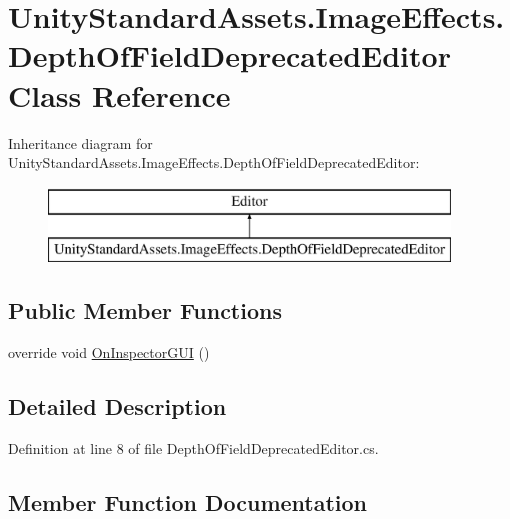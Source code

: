 \hypertarget{class_unity_standard_assets_1_1_image_effects_1_1_depth_of_field_deprecated_editor}{}\section{Unity\+Standard\+Assets.\+Image\+Effects.\+Depth\+Of\+Field\+Deprecated\+Editor Class Reference}
\label{class_unity_standard_assets_1_1_image_effects_1_1_depth_of_field_deprecated_editor}
Inheritance diagram for Unity\+Standard\+Assets.\+Image\+Effects.\+Depth\+Of\+Field\+Deprecated\+Editor\+:\begin{figure}[H]
\begin{center}
\leavevmode
\includegraphics[height=2.000000cm]{class_unity_standard_assets_1_1_image_effects_1_1_depth_of_field_deprecated_editor}
\end{center}
\end{figure}
\subsection*{Public Member Functions}
\begin{DoxyCompactItemize}
\item 
override void \mbox{\hyperlink{class_unity_standard_assets_1_1_image_effects_1_1_depth_of_field_deprecated_editor_a0317ccf1e66f28a7e35c65432642c6eb}{On\+Inspector\+G\+UI}} ()
\end{DoxyCompactItemize}


\subsection{Detailed Description}


Definition at line 8 of file Depth\+Of\+Field\+Deprecated\+Editor.\+cs.



\subsection{Member Function Documentation}
\mbox{\label{class_unity_standard_assets_1_1_image_effects_1_1_depth_of_field_deprecated_editor_a0317ccf1e66f28a7e35c65432642c6eb}} 
